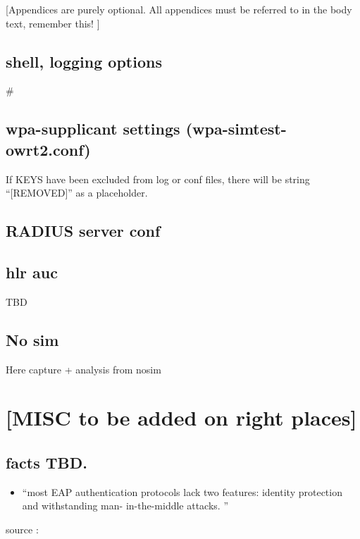 \documentclass[12pt,a4paper,english]{tutthesis}
\begin{document}
\begin{otherlanguage}{english}
[Appendices are purely optional.  All appendices must be referred to in
the body text, remember this! ]

\section{shell, logging options}
\label{sec-7-1}
\label{app:fulleap}
\lstset{basicstyle=\ttfamily,columns=fixed}
# %
\scriptsize

\normalsize



\section{wpa-supplicant settings (wpa-simtest-owrt2.conf)}
\label{sec-7-2}
\label{app:wpa-conf}
If KEYS have been excluded from log or conf files, there will be
string ``[REMOVED]''  as a placeholder.
\scriptsize

\normalsize

\section{RADIUS server conf}
\label{sec-7-3}
\label{app:radius-conf}
\scriptsize

\normalsize
\section{hlr auc}
\label{sec-7-4}

\label{app:hlraucgw}
\scriptsize

\normalsize
TBD
\scriptsize

\section{No sim}
\label{sec-7-5}
\label{app:nosim}

Here capture + analysis from nosim


\end{otherlanguage} %
\chapter{[MISC to be added on right places]}
\label{sec-8}
\section{facts TBD.}
\label{sec-8-1}
\begin{itemize}
\item ``most EAP authentication protocols lack two features: identity
protection and withstanding man- in-the-middle attacks. ''
\end{itemize}
source :
\end{document}
